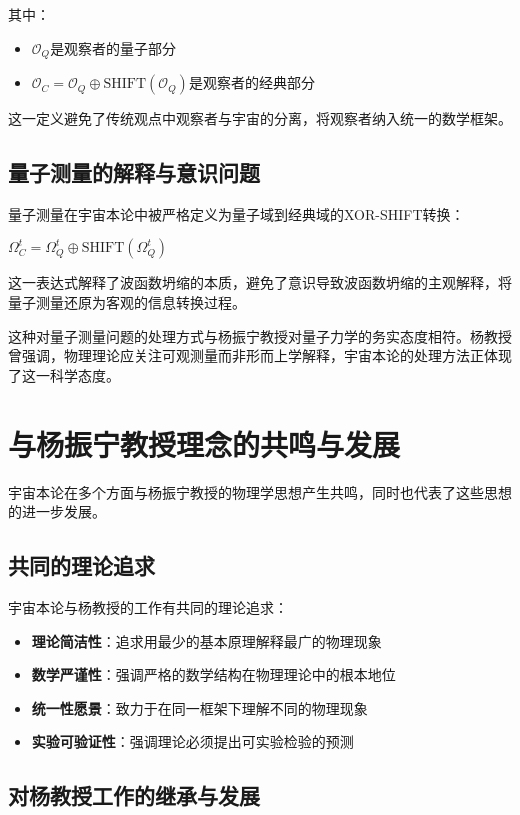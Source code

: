 其中：
\begin{itemize}
  \item $\mathcal{O}_Q$是观察者的量子部分
  \item $\mathcal{O}_C = \mathcal{O}_Q \oplus \text{SHIFT}(\mathcal{O}_Q)$是观察者的经典部分
\end{itemize}

这一定义避免了传统观点中观察者与宇宙的分离，将观察者纳入统一的数学框架。

\subsection{量子测量的解释与意识问题}

量子测量在宇宙本论中被严格定义为量子域到经典域的XOR-SHIFT转换：

$\Omega_C^{t} = \Omega_Q^{t} \oplus \text{SHIFT}(\Omega_Q^{t})$

这一表达式解释了波函数坍缩的本质，避免了意识导致波函数坍缩的主观解释，将量子测量还原为客观的信息转换过程。

这种对量子测量问题的处理方式与杨振宁教授对量子力学的务实态度相符。杨教授曾强调，物理理论应关注可观测量而非形而上学解释，宇宙本论的处理方法正体现了这一科学态度。

\section{与杨振宁教授理念的共鸣与发展}

宇宙本论在多个方面与杨振宁教授的物理学思想产生共鸣，同时也代表了这些思想的进一步发展。

\subsection{共同的理论追求}

宇宙本论与杨教授的工作有共同的理论追求：

\begin{itemize}
  \item \textbf{理论简洁性}：追求用最少的基本原理解释最广的物理现象
  \item \textbf{数学严谨性}：强调严格的数学结构在物理理论中的根本地位
  \item \textbf{统一性愿景}：致力于在同一框架下理解不同的物理现象
  \item \textbf{实验可验证性}：强调理论必须提出可实验检验的预测
\end{itemize}

\subsection{对杨教授工作的继承与发展}

